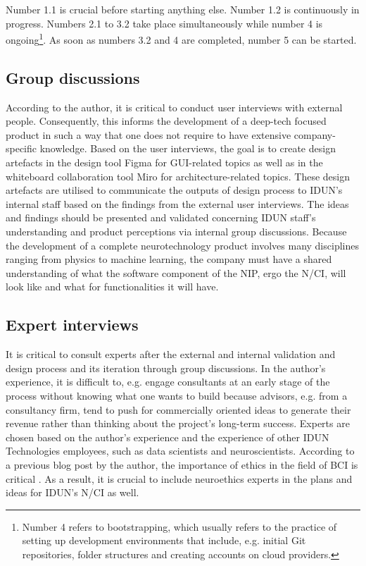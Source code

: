 Number 1.1 is crucial before starting anything else. Number 1.2 is continuously in progress. Numbers 2.1 to 3.2 take place simultaneously while number 4 is ongoing\footnote{Number 4 refers to bootstrapping, which usually refers to the practice of setting up development environments that include, e.g. initial Git repositories, folder structures and creating accounts on cloud providers.}. As soon as numbers 3.2 and 4 are completed, number 5 can be started.

\subsection{Group discussions}
\label{chapter3-group-discussions}

According to the author, it is critical to conduct user interviews with external people. Consequently, this informs the development of a deep-tech focused product in such a way that one does not require to have extensive company-specific knowledge. Based on the user interviews, the goal is to create design artefacts in the design tool Figma for GUI-related topics as well as in the whiteboard collaboration tool Miro for architecture-related topics. These design artefacts are utilised to communicate the outputs of design process to IDUN's internal staff based on the findings from the external user interviews. The ideas and findings should be presented and validated concerning IDUN staff's understanding and product perceptions via internal group discussions. Because the development of a complete neurotechnology product involves many disciplines ranging from physics to machine learning, the company must have a shared understanding of what the software component of the NIP, ergo the N/CI, will look like and what for functionalities it will have.

\subsection{Expert interviews}
\label{chapter3-expert-interviews}

It is critical to consult experts after the external and internal validation and design process and its iteration through group discussions. In the author's experience, it is difficult to, e.g. engage consultants at an early stage of the process without knowing what one wants to build because advisors, e.g. from a consultancy firm, tend to push for commercially oriented ideas to generate their revenue rather than thinking about the project's long-term success. Experts are chosen based on the author's experience and the experience of other IDUN Technologies employees, such as data scientists and neuroscientists. According to a previous blog post by the author, the importance of ethics in the field of BCI is critical \citep{burger_influence_2021}. As a result, it is crucial to include neuroethics experts in the plans and ideas for IDUN's N/CI as well.


